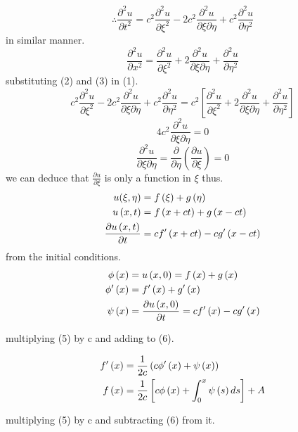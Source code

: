 \documentclass[]{article}
\begin{document}
\begin{equation}
\therefore \frac{\partial^2 u}{\partial t^2} = c^2\frac{\partial^2 u}{\partial\xi^2}-2c^2\frac{\partial^2 u}{\partial\xi\partial\eta}+c^2\frac{\partial^2 u}{\partial\eta^2}
\end{equation}
in similar manner.
\begin{equation}
\frac{\partial^2 u}{\partial x^2} = \frac{\partial^2 u}{\partial\xi^2}+2\frac{\partial^2 u}{\partial\xi\partial\eta}+\frac{\partial^2 u}{\partial\eta^2}
\end{equation}
substituting (2) and (3) in (1).
\[
c^2\frac{\partial^2 u}{\partial\xi^2}-2c^2\frac{\partial^2 u}{\partial\xi\partial\eta}+c^2\frac{\partial^2 u}{\partial\eta^2} = c^2\left[\frac{\partial^2 u}{\partial\xi^2}+2\frac{\partial^2 u}{\partial\xi\partial\eta}+\frac{\partial^2 u}{\partial\eta^2}\right]    
\]
\[
    4c^2 \frac{\partial^2 u}{\partial\xi\partial\eta} =0    
\]
\[
    \frac{\partial^2 u}{\partial\xi\partial\eta} = \frac{\partial}{\partial\eta}\left(\frac{\partial u}{\partial\xi}\right)= 0    
\]
we can deduce that $\frac{\partial u}{\partial\xi}$ is only a function in $\xi$ thus.
\begin{align}
u(\xi , \eta) &= f\left(\xi\right)+g\left(\eta \right)\notag
\\
u\left(x,t\right)&=f\left(x+ct\right)+g\left(x-ct\right)
\\
\frac{\partial u\left(x,t\right)}{\partial t} &= cf'\left(x+ct\right)-cg'\left(x-ct\right)\notag
\end{align}
from the initial conditions.
\begin{align}
\phi\left(x\right) &= u\left(x,0\right)= f\left(x\right)+g\left(x\right)\notag
\\ 
\phi'\left(x\right) &= f'\left(x\right)+g'\left(x\right)
\\ 
\psi\left(x\right)&=\frac{\partial u\left(x,0\right)}{\partial t} = cf'\left(x\right)-cg'\left(x\right)
\end{align}

multiplying (5) by c and adding to (6).

\begin{align}
f'\left(x\right) &= \frac{1}{2c}\left(c\phi'\left(x\right)+\psi\left(x\right)\right)\notag
\\ 
f\left(x\right) &= \frac{1}{2c}\left[c\phi\left(x\right)+\int_0^x \psi\left(s\right)ds\right]+A
\end{align}

multiplying (5) by c and subtracting (6) from it.
\end{document}
